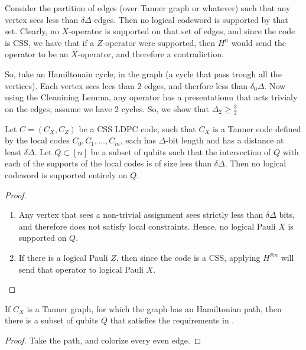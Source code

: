 \documentclass[manuscript,screen,review]{acmart}
\begin{document}
{\begin{lemma}
\end{lemma}
Consider the partition of edges (over Tanner graph or whatever) such that any vertex sees less than $\delta \Delta$ edges. Then no logical codeword is supported by that set. Clearly, no $X$-operator is supported on that set of edges, and since the code is CSS, we have that if a $Z$-operator were supported, then $H^n$ would send the operator to be an $X$-operator, and therefore a contradiction.

So, take an Hamiltonain cycle, in the graph (a cycle that pass trough all the vertices). Each vertex sees lees than $2$ edges, and therfore less than $\delta_{0}\Delta$. Now using the Cleanining Lemma, any operator has a presentationn that acts trivialy on the edges, assume we have 2 cycles. 
So, we show that $\Delta_{2} \ge \frac{3}{2}$

\begin{claim}
  \label{claim:cssstab}
Let $C = \left( C_{X}, C_{Z} \right)$ be a CSS LDPC code, such that $C_{X}$ is a Tanner code defined by the local codes $C_{0}, C_{1}, \ldots, C_{m}$, each has $\Delta$-bit length and has a distance at least $\delta \Delta$. Let $Q \subset [n]$ be a subset of qubits such that the intersection of $Q$ with each of the supports of the local codes is of size less than $\delta \Delta$. Then no logical codeword is supported entirely on $Q$.


\end{claim}
\begin{proof}
  \begin{enumerate}
    \item Any vertex that sees a non-trivial assignment sees strictly less than $\delta \Delta$ bits, and therefore does not satisfy local constraints. Hence, no logical Pauli $X$ is supported on $Q$.
    \item  If there is a logical Pauli $Z$, then since the code is a CSS, applying $H^{\otimes n}$ will send that operator to logical Pauli $X$.
  \end{enumerate}
\end{proof}

\begin{claim}
If $C_{X}$ is a Tanner graph, for which the graph has an Hamiltonian path, then there is a subset of qubits $Q$ that satisfies the requirements in .
\end{claim}
\begin{proof}
  Take the path, and colorize every even edge. 
\end{proof}

}
\end{document}
